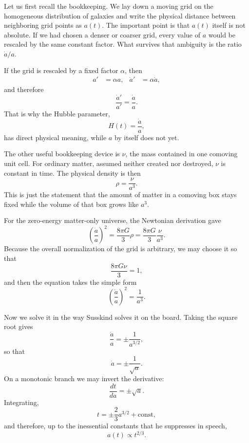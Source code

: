 Let us first recall the bookkeeping. We lay down a moving grid on the homogeneous distribution of galaxies and write the physical distance between neighboring grid points as \(a(t)\). The important point is that \(a(t)\) itself is not absolute. If we had chosen a denser or coarser grid, every value of \(a\) would be rescaled by the same constant factor. What survives that ambiguity is the ratio \(\dot a/a\).

If the grid is rescaled by a fixed factor \(\alpha\), then
\begin{align}
a' &= \alpha a, &
\dot a' &= \alpha \dot a,
\end{align}
and therefore
\begin{equation}
\frac{\dot a'}{a'}=\frac{\dot a}{a}.
\end{equation}
That is why the Hubble parameter,
\begin{equation}
H(t)=\frac{\dot a}{a},
\end{equation}
has direct physical meaning, while \(a\) by itself does not yet.

The other useful bookkeeping device is \(\nu\), the mass contained in one comoving unit cell. For ordinary matter, assumed neither created nor destroyed, \(\nu\) is constant in time. The physical density is then
\begin{equation}
\rho=\frac{\nu}{a^3}.
\end{equation}
This is just the statement that the amount of matter in a comoving box stays fixed while the volume of that box grows like \(a^3\).

For the zero-energy matter-only universe, the Newtonian derivation gave
\begin{equation}
\left(\frac{\dot a}{a}\right)^2=\frac{8\pi G}{3}\rho
=\frac{8\pi G}{3}\frac{\nu}{a^3}.
\end{equation}
Because the overall normalization of the grid is arbitrary, we may choose it so that
\begin{equation}
\frac{8\pi G \nu}{3}=1,
\end{equation}
and then the equation takes the simple form
\begin{equation}
\left(\frac{\dot a}{a}\right)^2=\frac{1}{a^3}.
\end{equation}

Now we solve it in the way Susskind solves it on the board. Taking the square root gives
\begin{equation}
\frac{\dot a}{a}=\pm \frac{1}{a^{3/2}},
\end{equation}
so that
\begin{equation}
\dot a=\pm \frac{1}{\sqrt a}.
\end{equation}
On a monotonic branch we may invert the derivative:
\begin{equation}
\frac{dt}{da}=\pm \sqrt a.
\end{equation}
Integrating,
\begin{equation}
t=\pm \frac{2}{3}a^{3/2}+\text{const},
\end{equation}
and therefore, up to the inessential constants that he suppresses in speech,
\begin{equation}
a(t)\propto t^{2/3}.
\end{equation}

